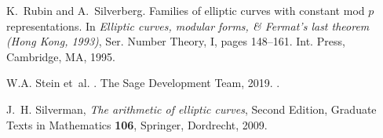 \documentclass[12pt, reqno]{amsart}
\numberwithin{equation}{section}
\theoremstyle{definition}
\theoremstyle{remark}
\begin{document}
\begin{thebibliography}{999}
K.~Rubin and A.~Silverberg.
\newblock Families of elliptic curves with constant mod {$p$} representations.
\newblock In {\em Elliptic curves, modular forms, \& {F}ermat's last theorem
  ({H}ong {K}ong, 1993)}, Ser. Number Theory, I, pages 148--161. Int. Press,
  Cambridge, MA, 1995.

W.\thinspace{}A. Stein et~al.
.
\newblock The Sage Development Team, 2019.
.

 J.\ H. Silverman,
{\em The arithmetic of elliptic curves},
Second Edition, Graduate Texts in Mathematics {\bf 106}, Springer, Dordrecht, 2009.



\end{thebibliography}
\end{document}
